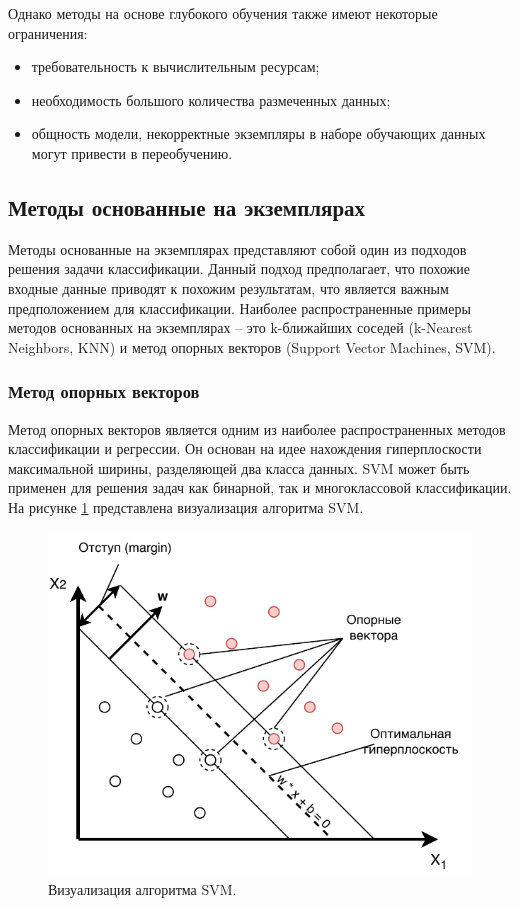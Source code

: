 Однако методы на основе глубокого обучения также имеют некоторые ограничения:

\begin{itemize}[leftmargin=1.6\parindent, label*=---]
	\item требовательность к вычислительным ресурсам;
	\item необходимость большого количества размеченных данных;
	\item общность модели, некорректные экземпляры в наборе обучающих данных могут привести в переобучению.
\end{itemize}

\subsection{Методы основанные на экземплярах}

Методы основанные на экземплярах представляют собой один из подходов решения задачи классификации. Данный подход предполагает, что похожие входные данные приводят к похожим результатам, что является важным предположением для классификации. Наиболее распространенные примеры методов основанных на экземплярах -- это k-ближайших соседей (k-Nearest Neighbors, KNN) и метод опорных векторов (Support Vector Machines, SVM).

\subsubsection*{Метод опорных векторов}

Метод опорных векторов является одним из наиболее распространенных методов классификации и регрессии. Он основан на идее нахождения гиперплоскости максимальной ширины, разделяющей два класса данных. SVM может быть применен для решения задач как бинарной, так и многоклассовой классификации. На рисунке \ref{fig:svm} представлена визуализация алгоритма SVM.

\newpage

\begin{figure}[hbtp]
	\centering
	\includegraphics[width=\textwidth]{img/svm.pdf}
	\caption{Визуализация алгоритма SVM.}
	\label{fig:svm}
\end{figure}



